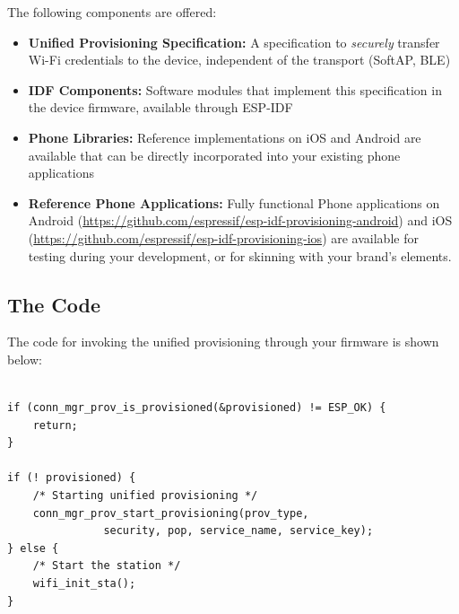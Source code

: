 \documentclass[main.tex]{subfiles}
\begin{document}

The following components are offered:
\begin{itemize}
    \item \textbf{Unified Provisioning Specification:} A specification to \textit{securely} transfer Wi-Fi credentials to the device, independent of the transport (SoftAP, BLE)
    \item \textbf{IDF Components:} Software modules that implement this specification in the device firmware, available through ESP-IDF
    \item \textbf{Phone Libraries:} Reference implementations on iOS and Android are available that can be directly incorporated into your existing phone applications
    \item \textbf{Reference Phone Applications:} Fully functional Phone applications on Android (\url{https://github.com/espressif/esp-idf-provisioning-android}) and iOS (\url{https://github.com/espressif/esp-idf-provisioning-ios}) are available for testing during your development, or for skinning with your brand's elements.
\end{itemize}

\subsection{The Code}\label{sec:unified_prov}
The code for invoking the unified provisioning through your firmware is shown below:
\begin{verbatim}

if (conn_mgr_prov_is_provisioned(&provisioned) != ESP_OK) {
    return;
}

if (! provisioned) {
    /* Starting unified provisioning */
    conn_mgr_prov_start_provisioning(prov_type,
               security, pop, service_name, service_key);
} else {
    /* Start the station */
    wifi_init_sta();
}
\end{verbatim}
\end{document}
